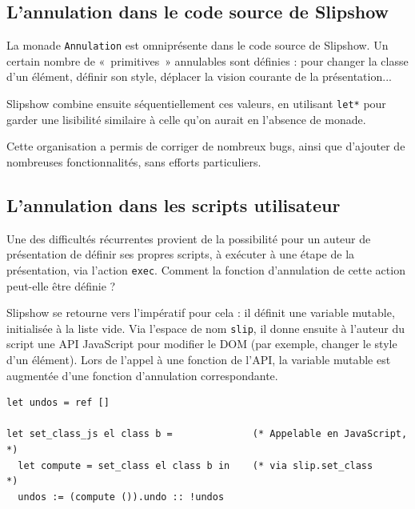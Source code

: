 \documentclass[final]{jflart}
\begin{document}


\subsection{L'annulation dans le code source de Slipshow}

La monade \texttt{Annulation} est omniprésente dans le code source de Slipshow. Un certain nombre de «~primitives~» annulables sont définies : pour changer la classe d'un élément, définir son style, déplacer la vision courante de la présentation...

Slipshow combine ensuite séquentiellement ces valeurs, en utilisant \texttt{let*} pour garder une lisibilité similaire à celle qu'on aurait en l'absence de monade.

Cette organisation a permis de corriger de nombreux bugs, ainsi que d'ajouter de nombreuses fonctionnalités, sans efforts particuliers.

\subsection{L'annulation dans les scripts utilisateur}

Une des difficultés récurrentes provient de la possibilité pour un auteur de présentation de définir ses propres scripts, à exécuter à une étape de la présentation, via l'action \texttt{exec}. Comment la fonction d'annulation de cette action peut-elle être définie ?

Slipshow se retourne vers l'impératif pour cela : il définit une variable mutable, initialisée à la liste vide. Via l'espace de nom \texttt{slip}, il donne ensuite à l'auteur du script une API JavaScript pour modifier le DOM (par exemple, changer le style d'un élément). Lors de l'appel à une fonction de l'API, la variable mutable est augmentée d'une fonction d'annulation correspondante.

\begin{verbatim}
let undos = ref []

let set_class_js el class b =              (* Appelable en JavaScript, *)
  let compute = set_class el class b in    (* via slip.set_class       *)
  undos := (compute ()).undo :: !undos
\end{verbatim}
\end{document}
